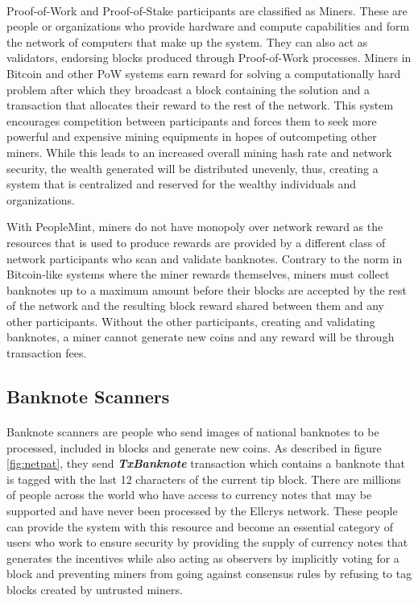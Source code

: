 \paragraph{}Proof-of-Work and Proof-of-Stake participants are classified as Miners. These are people or organizations who provide hardware and compute capabilities and form the network of computers that make up the system. They can also act as validators, endorsing blocks produced through Proof-of-Work processes. Miners in Bitcoin and other PoW systems earn reward for solving a computationally hard problem after which they broadcast a block containing the solution and a transaction that allocates their reward to the rest of the network. This system encourages competition between participants and forces them to seek more powerful and expensive mining equipments in hopes of outcompeting other miners. While this leads to an increased overall mining hash rate and network security, the wealth generated will be distributed unevenly, thus, creating a system that is centralized and reserved for the wealthy individuals and organizations. 

With PeopleMint, miners do not have monopoly over network reward as the resources that is used to produce rewards are provided by a different class of network participants who scan and validate banknotes. Contrary to the norm in Bitcoin-like systems where the miner rewards themselves, miners must collect banknotes up to a maximum amount before their blocks are accepted by the rest of the network and the resulting block reward shared between them and any other participants.  Without the other participants, creating and validating banknotes, a miner cannot generate new coins and any reward will be through transaction fees. 

\newpage
\subsection{Banknote Scanners}
\paragraph{}Banknote scanners are people who send images of national banknotes to be processed, included in blocks and generate new coins. As described in figure \ref{fig:netpat}, they send \textbf{\textit{TxBanknote}} transaction which contains a banknote that is tagged with the last 12 characters of the current tip block. There are millions of people across the world who have access to currency notes that may be supported and have never been processed by the Ellcrys network. These people can provide the system with this resource and become an essential category of users who work to ensure security by providing the supply of currency notes that generates the incentives while also acting as observers by implicitly voting for a block and preventing miners from going against consensus rules by refusing to tag blocks created by untrusted miners. 

